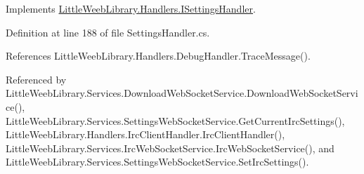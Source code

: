 Implements \mbox{\hyperlink{interface_little_weeb_library_1_1_handlers_1_1_i_settings_handler_a8ee9be789e628c80fae0db96d890569b}{Little\+Weeb\+Library.\+Handlers.\+I\+Settings\+Handler}}.



Definition at line 188 of file Settings\+Handler.\+cs.



References Little\+Weeb\+Library.\+Handlers.\+Debug\+Handler.\+Trace\+Message().



Referenced by Little\+Weeb\+Library.\+Services.\+Download\+Web\+Socket\+Service.\+Download\+Web\+Socket\+Service(), Little\+Weeb\+Library.\+Services.\+Settings\+Web\+Socket\+Service.\+Get\+Current\+Irc\+Settings(), Little\+Weeb\+Library.\+Handlers.\+Irc\+Client\+Handler.\+Irc\+Client\+Handler(), Little\+Weeb\+Library.\+Services.\+Irc\+Web\+Socket\+Service.\+Irc\+Web\+Socket\+Service(), and Little\+Weeb\+Library.\+Services.\+Settings\+Web\+Socket\+Service.\+Set\+Irc\+Settings().


